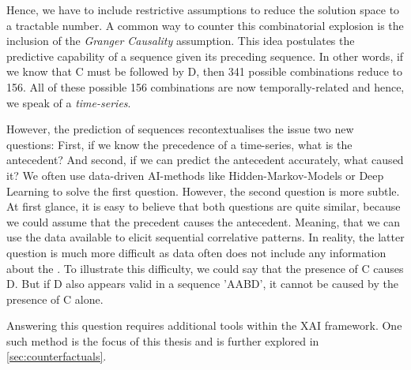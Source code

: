 \documentclass[./../../paper.tex]{subfiles}
\begin{document}
Hence, we have to include restrictive assumptions to reduce the solution space to a tractable number. A common way to counter this combinatorial explosion is the inclusion of the \emph{Granger Causality} assumption. 
This idea postulates the predictive capability of a sequence given its preceding sequence. 
In other words, if we know that C must be followed by D, then 341 possible combinations reduce to 156. All of these possible 156 combinations are now temporally-related and hence, we speak of a \emph{time-series}.


However, the prediction of sequences recontextualises the issue two new questions: 
First, if we know the precedence of a time-series, what is the antecedent? 
And second, if we can predict the antecedent accurately, what caused it? 
We often use data-driven AI-methods like Hidden-Markov-Models or Deep Learning to solve the first question. 
However, the second question is more subtle. At first glance, it is easy to believe that both questions are quite similar, because we could assume that the precedent causes the antecedent. Meaning, that we can use the data available to elicit sequential correlative patterns. 
In reality, the latter question is much more difficult as data often does not include any information about the . 
To illustrate this difficulty, we could say that the presence of C causes D. 
But if D also appears valid in a sequence 'AABD', it cannot be caused by the presence of C alone. 

Answering this question requires additional tools within the \gls{XAI} framework. 
One such method is the focus of this thesis and is further explored in \autoref{sec:counterfactuals}.
\end{document}
